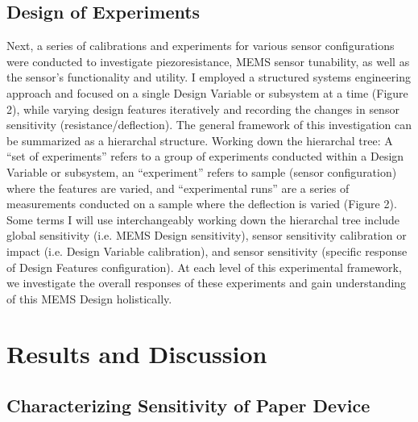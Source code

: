 \documentclass[12pt]{article}
\begin{document}
\subsection{Design of Experiments}
Next, a series of calibrations and experiments for various sensor configurations were conducted to investigate piezoresistance, MEMS sensor tunability, as well as the sensor’s functionality and utility. I employed a structured systems engineering approach and focused on a single Design Variable or subsystem at a time (Figure 2), while varying design features iteratively and recording the changes in sensor sensitivity (resistance/deflection). The general framework of this investigation can be summarized as a hierarchal structure. Working down the hierarchal tree: A “set of experiments” refers to a group of experiments conducted within a Design Variable or subsystem, an “experiment” refers to sample (sensor configuration) where the features are varied, and “experimental runs” are a series of measurements conducted on a sample where the deflection is varied (Figure 2). Some terms I will use interchangeably working down the hierarchal tree include global sensitivity (i.e. MEMS Design sensitivity), sensor sensitivity calibration or impact (i.e. Design Variable calibration), and sensor sensitivity (specific response of Design Features configuration). At each level of this experimental framework, we investigate the overall responses of these experiments and gain understanding of this MEMS Design holistically. 









\pagebreak


\section{Results and Discussion}
\subsection{Characterizing Sensitivity of Paper Device}
\end{document}

